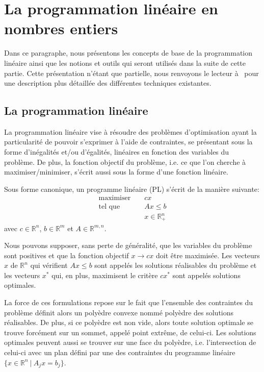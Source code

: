 
\section{La programmation linéaire en nombres entiers}
\label{sec:PLNE}
Dans ce paragraphe, nous présentons les concepts de base de la
programmation linéaire ainsi que les notions et outils qui seront
utilisés dans la suite de cette partie. Cette présentation n'étant que
partielle, nous renvoyons le lecteur à~\cite{LP} pour une description
plus détaillée des différentes techniques existantes.

\subsection{La programmation linéaire}

La programmation linéaire vise à résoudre des problèmes
d'optimisation ayant la particularité de pouvoir s'exprimer à
l'aide de contraintes, se présentant sous la forme d'inégalités
et/ou d'égalités, linéaires en fonction des variables du problème.
De plus, la fonction objectif du problème, i.e. ce que l'on
cherche à maximiser/minimiser, s'écrit aussi sous la forme d'une
fonction linéaire.

Sous forme canonique, un programme linéaire (PL) s'écrit de la manière
suivante: 
 \[ \begin{array}{lcl}
\text{maximiser } & & \displaystyle cx\\ 
\text{tel que }& & \displaystyle Ax \le b\\
 & & \displaystyle x \in \mathbb{R}^n_+
 \end{array}
\]
avec $c \in \mathbb{R}^n$, $b \in \mathbb{R}^m$ et $A \in
\mathbb{R}^{m,n}$. 

Nous pouvons supposer, sans perte de généralité, que les variables du
problème sont positives et que la fonction objectif $x\rightarrow cx$
doit être maximisée. Les vecteurs $x$ de $\mathbb{R}^n$ qui vérifient
$Ax \le b$ sont appelés les solutions réalisables du problème et les
vecteurs $x^*$ qui, en plus, maximisent le critère $cx^*$ sont appelés
solutions optimales.    

La force de ces formulations repose sur le fait que l'ensemble des
contraintes du problème définit alors un polyèdre convexe nommé
polyèdre des solutions réalisables. De plus, si ce polyèdre est non
vide, alors toute solution optimale se trouve forcément sur un sommet,
appelé point extrême, de celui-ci. Les solutions optimales peuvent aussi
se trouver sur une face du polyèdre, i.e. l'intersection de celui-ci
avec un plan défini par une des contraintes du programme linéaire $\{x
\in \mathbb{R}^n\ | \ A_jx=b_j\}$. 

